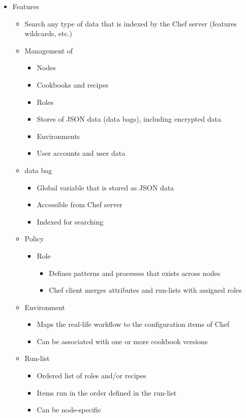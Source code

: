 \begin{itemize}
\begin{itemize}
\begin{itemize}
			\item Features
			\begin{itemize}
				\item Search any type of data that is indexed by the Chef server (features wildcards, etc.)
				\item Management of
				\begin{itemize}
					\item Nodes
					\item Cookbooks and recipes
					\item Roles
					\item Stores of JSON data (data bags), including encrypted data
					\item Environments
					\item User accounts and user data
				\end{itemize}
				\item data bag
				\begin{itemize}
					\item Global variable that is stored as JSON data
					\item Accessible from Chef server
					\item Indexed for searching
				\end{itemize}
				\item Policy
				\begin{itemize}
					\item Role
					\begin{itemize}
						\item Defines patterns and processes that exists across nodes
						\item Chef client merges attributes and run-lists with assigned roles
					\end{itemize}
				\end{itemize}
				\item Environment
				\begin{itemize}
					\item Maps the real-life workflow to the configuration items of Chef
					\item Can be associated with one or more cookbook versions
				\end{itemize}
				\item Run-list
				\begin{itemize}
					\item Ordered list of roles and/or recipes
					\item Items run in the order defined in the run-list
					\item Can be node-specific

\end{itemize}
\end{itemize}
\end{itemize}
\end{itemize}
\end{itemize}
